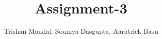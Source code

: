 \usepackage[11pt]{article}
\usepackage{trishan2}
\title{Assignment-3}
\author{Trishan Mondal, Soumya Dasgupta, Aaratrick Basu}
\date{}


 \maketitle
